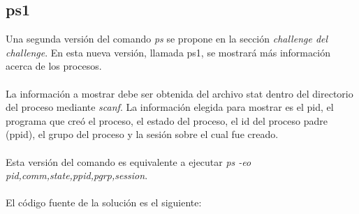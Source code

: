 \documentclass[a4paper, 12pt]{article}
\begin{document}
		\subsection{ps1}
		Una segunda versión del comando \textit{ps} se propone en la sección \textit{challenge del challenge}. En esta nueva versión, llamada ps1, se mostrará más información acerca de los procesos. \\\\
		La información a mostrar debe ser obtenida del archivo stat dentro del directorio del proceso mediante \textit{scanf}. La información elegida para mostrar es el pid, el programa que creó el proceso, el estado del proceso, el id del proceso padre (ppid), el grupo del proceso y la sesión sobre el cual fue creado.\\\\
		Esta versión del comando es equivalente a ejecutar \textit{ps -eo pid,comm,state,ppid,pgrp,session}.\\\\
		El código fuente de la solución es el siguiente:
		
		\bigskip\bigskip\bigskip
		
		
			
\end{document}
